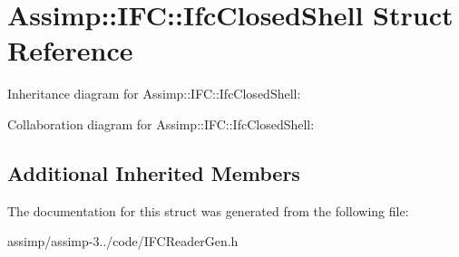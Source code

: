 \hypertarget{struct_assimp_1_1_i_f_c_1_1_ifc_closed_shell}{\section{Assimp\+:\+:I\+F\+C\+:\+:Ifc\+Closed\+Shell Struct Reference}
\label{struct_assimp_1_1_i_f_c_1_1_ifc_closed_shell}
}


Inheritance diagram for Assimp\+:\+:I\+F\+C\+:\+:Ifc\+Closed\+Shell\+:


Collaboration diagram for Assimp\+:\+:I\+F\+C\+:\+:Ifc\+Closed\+Shell\+:
\subsection*{Additional Inherited Members}


The documentation for this struct was generated from the following file\+:\begin{DoxyCompactItemize}
\item 
assimp/assimp-\/3../code/I\+F\+C\+Reader\+Gen.\+h\end{DoxyCompactItemize}
